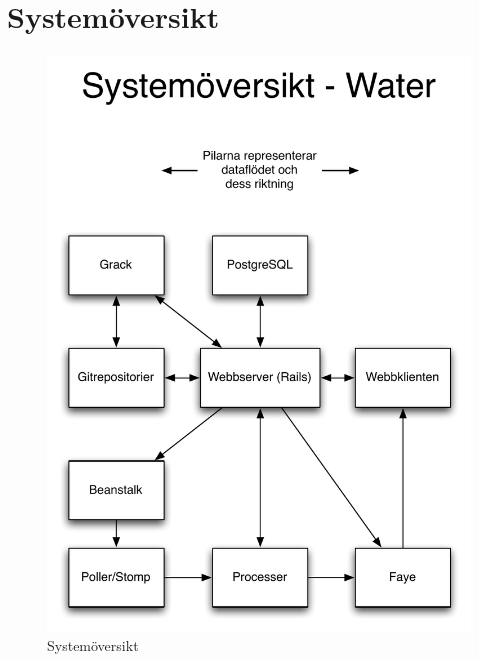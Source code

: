 \chapter{Systemöversikt}
\label{appendix:systemoversikt}

\begin{figure}
  \includegraphics[width=15.0cm]{fig/misc/system_architecture_white_bg.pdf}             
  \caption[Systemöversikt]
  {Systemöversikt}
\end{figure}
